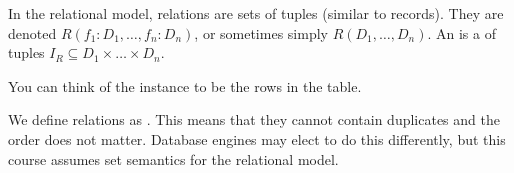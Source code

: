In the relational model, relations are sets of tuples (similar to \glspl{record}). They are denoted $R(f_1: D_1, \ldots, f_n: D_n)$,
or sometimes simply $R(D_1, \ldots, D_n)$.
An  is a  of tuples $I_R \subseteq D_1 \times \ldots \times D_n$.

\inlineintuition You can think of the instance to be the rows in the table.

 We define relations as . This means that they cannot contain duplicates and the order does not matter.
Database engines may elect to do this differently, but this course assumes set semantics for the relational model.
